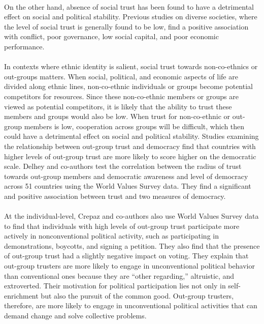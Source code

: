 \documentclass[a4paper, 12pt]{article}
\begin{document}
\paragraph{}
On the other hand, absence of social trust has been found to have a detrimental effect on social and political stability. Previous studies on diverse societies, where the level of social trust is generally found to be low\cite{dinesenEthnicDiversitySocial2020}, find a positive association with conflict\cite{varshneyEthnicityEthnicConflict2009}, poor governance\cite{alesinaPublicGoodsEthnic1999}, low social capital\cite{alesinaEthnicDiversityEconomic2005}, and poor economic performance\cite{alesinaEthnicDiversityEconomic2005, easterlyAfricaGrowthTragedy1997}.
\paragraph{}
In contexts where ethnic identity is salient, social trust towards non-co-ethnics or out-groups matters. When social, political, and economic aspects of life are divided along ethnic lines, non-co-ethnic individuals or groups become potential competitors for resources. Since these non-co-ethnic members or groups are viewed as potential competitors, it is likely that the ability to trust these members and groups would also be low. When trust for non-co-ethnic or out-group members is low, cooperation across groups will be difficult, which then could have a detrimental effect on social and political stability. Studies examining the relationship between out-group trust and democracy find that countries with higher levels of out-group trust are more likely to score higher on the democratic scale. Delhey and co-authors\cite{delheyHowGeneralTrust2011} test the correlation between the radius of trust towards out-group members  and democratic awareness and level of democracy across 51 countries using the World Values Survey data. They find a significant and positive association between trust and two measures of democracy.
\paragraph{}  
At the individual-level, Crepaz and co-authors\cite{crepazWhatTrustGot2017} also use World Values Survey data to find that individuals with high levels of out-group trust  participate more actively in nonconventional political activity, such as participating in demonstrations, boycotts, and signing a petition. They also find that the presence of out-group trust had a slightly negative impact on voting. They explain that out-group trusters are more likely to engage in unconventional political behavior than conventional ones because they are “other regarding,” altruistic, and extroverted\cite{stollePoliticsSupermarketPolitical2005}. Their motivation for political participation lies not only in self-enrichment but also the pursuit of the common good. Out-group trusters, therefore, are more likely to engage in unconventional political activities that can demand change and solve collective problems. 
\end{document}
